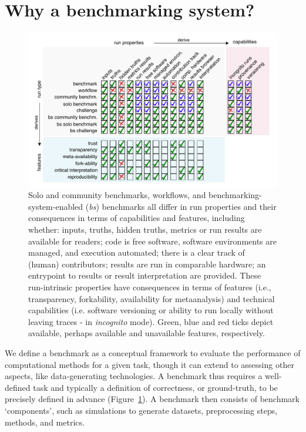 \documentclass[11pt]{article}
\begin{document}
\section*{Why a benchmarking system?}


\begin{figure}
    \centering
    \includegraphics[width=\linewidth]{figures/fig1_fig_benchmarking_aligned.pdf}
     \caption[Run types, properties, capabilities and features.]{Solo and community benchmarks, workflows, and benchmarking-system-enabled (\textit{bs}) benchmarks all differ in run properties and their consequences in terms of capabilities and features, including whether: inputs, truths, hidden truths, metrics or run results are available for readers; code is free software, software environments are managed, and execution automated; there is a clear track of (human) contributors; results are run in comparable hardware; an entrypoint to results or result interpretation are provided. These run-intrinsic properties have consequences in terms of features (i.e., transparency, forkability, availability for metaanalysis) and technical capabilities (i.e. software versioning or ability to run locally without leaving traces - in \textit{incognito} mode). Green, blue and red ticks depict available, perhaps available and unavailable features, respectively. \label{fig:definitions}}
    
\end{figure}


We define a benchmark as a conceptual framework to evaluate the performance of computational methods for a given task, though it can extend to assessing other aspects, like data-generating technologies. A benchmark thus requires a well-defined task and typically a definition of correctness, or ground-truth, to be precisely defined in advance  (Figure~\ref{fig:definitions}). A benchmark then consists of benchmark `components', such as simulations to generate datasets, preprocessing steps, methods, and metrics. 
\end{document}
